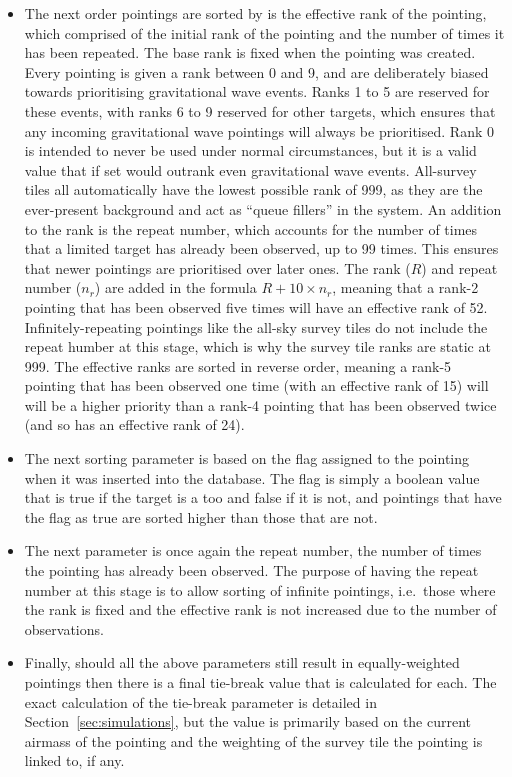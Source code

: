 \begin{colsection}
\begin{colsection}
\begin{itemize}
\item The next order pointings are sorted by is the effective rank of the pointing, which comprised of the initial rank of the pointing and the number of times it has been repeated. The base rank is fixed when the pointing was created. Every pointing is given a rank between 0 and 9, and are deliberately biased towards prioritising gravitational wave events. Ranks 1 to 5 are reserved for these events, with ranks 6 to 9 reserved for other targets, which ensures that any incoming gravitational wave pointings will always be prioritised. Rank 0 is intended to never be used under normal circumstances, but it is a valid value that if set would outrank even gravitational wave events. All-survey tiles all automatically have the lowest possible rank of 999, as they are the ever-present background and act as ``queue fillers'' in the system. An addition to the rank is the repeat number, which accounts for the number of times that a limited target has already been observed, up to 99 times. This ensures that newer pointings are prioritised over later ones. The rank ($R$) and repeat number ($n_r$) are added in the formula $R + 10\times n_r$, meaning that a rank-2 pointing that has been observed five times will have an effective rank of 52. Infinitely-repeating pointings like the all-sky survey tiles do not include the repeat humber at this stage, which is why the survey tile ranks are static at 999. The effective ranks are sorted in reverse order, meaning a rank-5 pointing that has been observed one time (with an effective rank of 15) will will be a higher priority than a rank-4 pointing that has been observed twice (and so has an effective rank of 24).

\item The next sorting parameter is based on the  flag assigned to the pointing when it was inserted into the database. The flag is simply a boolean value that is true if the target is a \gls{too} and false if it is not, and pointings that have the flag as true are sorted higher than those that are not.

\item The next parameter is once again the repeat number, the number of times the pointing has already been observed. The purpose of having the repeat number at this stage is to allow sorting of infinite pointings, i.e.\ those where the rank is fixed and the effective rank is not increased due to the number of observations.

\item Finally, should all the above parameters still result in equally-weighted pointings then there is a final tie-break value that is calculated for each. The exact calculation of the tie-break parameter is detailed in Section~\ref{sec:simulations}, but the value is primarily based on the current airmass of the pointing and the weighting of the survey tile the pointing is linked to, if any.


\end{itemize}
\end{colsection}
\end{colsection}
